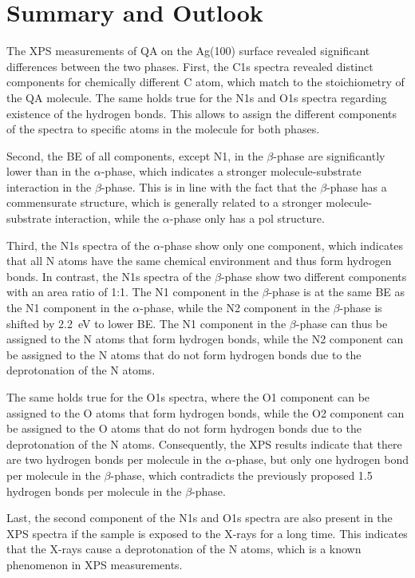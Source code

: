 \chapter{Summary and Outlook}

The \ac{XPS} measurements of \ac{QA} on the Ag(100) surface revealed significant differences between the two phases. First, the C1s spectra revealed distinct components for chemically different C atom, which match to the stoichiometry of the \ac{QA} molecule. The same holds true for the N1s and O1s spectra regarding existence of the hydrogen bonds. This allows to assign the different components of the spectra to specific atoms in the molecule for both phases.

Second, the \ac{BE} of all components, except N1, in the $\beta$-phase are significantly lower than in the $\alpha$-phase, which indicates a stronger molecule-substrate interaction in the $\beta$-phase. This is in line with the fact that the $\beta$-phase has a commensurate structure, which is generally related to a stronger molecule-substrate interaction, while the $\alpha$-phase only has a \ac{pol} structure.

Third, the N1s spectra of the $\alpha$-phase show only one component, which indicates that all N atoms have the same chemical environment and thus form hydrogen bonds. In contrast, the N1s spectra of the $\beta$-phase show two different components with an area ratio of 1:1. The N1 component in the $\beta$-phase is at the same \ac{BE} as the N1 component in the $\alpha$-phase, while the N2 component in the $\beta$-phase is shifted by 2.2~\si{eV} to lower \ac{BE}. The N1 component in the $\beta$-phase can thus be assigned to the N atoms that form hydrogen bonds, while the N2 component can be assigned to the N atoms that do not form hydrogen bonds due to the deprotonation of the N atoms. 

The same holds true for the O1s spectra, where the O1 component can be assigned to the O atoms that form hydrogen bonds, while the O2 component can be assigned to the O atoms that do not form hydrogen bonds due to the deprotonation of the N atoms. Consequently, the \ac{XPS} results indicate that there are two hydrogen bonds per molecule in the $\alpha$-phase, but only one hydrogen bond per molecule in the $\beta$-phase, which contradicts the previously proposed 1.5 hydrogen bonds per molecule in the $\beta$-phase.\autocite{Humberg2020,Humberg2025}

Last, the second component of the N1s and O1s spectra are also present in the \ac{XPS} spectra if the sample is exposed to the X-rays for a long time. This indicates that the X-rays cause a deprotonation of the N atoms, which is a known phenomenon in \ac{XPS} measurements. 



